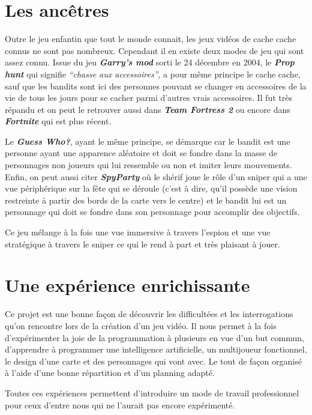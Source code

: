 \documentclass[12pt]{report}
\begin{document}
    \section{Les ancêtres}
        \par Outre le jeu enfantin que tout le monde connait, les jeux vidéos de cache cache connus ne sont pas nombreux. Cependant il en existe deux modes de jeu qui sont assez connu. Issue du jeu \textit{\textbf{Garry’s mod}} sorti le 24 décembre en 2004, le \textit{\textbf{Prop hunt}} qui signifie \textit{“chasse aux accessoires”}, a pour même principe le cache cache, sauf que les bandits sont ici des personnes pouvant se changer en accessoires de la vie de tous les jours pour se cacher parmi d’autres vrais accessoires. Il fut très répandu et on peut le retrouver aussi dans \textbf{\textit{Team Fortress 2}} ou encore dans \textbf{\textit{Fortnite}} qui est plus récent.\\ \par Le \textbf{\textit{Guess Who?}}, ayant le même principe, se démarque car le bandit est une personne ayant une apparence aléatoire et doit se fondre dans la masse de personnages non joueurs qui lui ressemble ou non et imiter leurs mouvements. Enfin, on peut aussi citer \textbf{\textit{SpyParty}} où le shérif joue le rôle d’un sniper qui a une vue périphérique sur la fête qui se déroule (c’est à dire, qu’il possède une vision restreinte à partir des bords de la carte vers le centre) et le bandit lui est un personnage qui doit se fondre dans son personnage pour accomplir des objectifs. \par Ce jeu mélange à la fois une vue immersive à travers l’espion et une vue stratégique à travers le sniper ce qui le rend à part et très plaisant à jouer.
    \section{Une expérience enrichissante}
        Ce projet est une bonne façon de découvrir les difficultées et les interrogations qu’on rencontre lors de la création d’un jeu vidéo. Il nous permet à la fois d’expérimenter la joie de la programmation à plusieurs en vue d’un but commun, d’apprendre à programmer une intelligence artificielle, un multijoueur fonctionnel, le design d’une carte et des personnages qui vont avec. Le tout de façon organisé à l’aide d’une bonne répartition et d’un planning adapté. \\ \par Toutes ces expériences permettent d’introduire un mode de travail professionnel pour ceux d’entre nous qui ne l’aurait pas encore expérimenté. 
\end{document}
